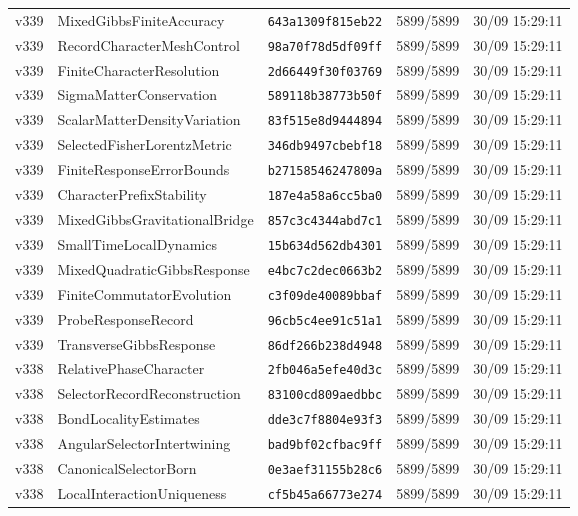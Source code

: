 \documentclass[11pt]{article}
\theoremstyle{definition}\newtheorem{deriv}{Derivation}
\begin{document}
{\begin{longtable}{@{}lllll@{}}
v339 & MixedGibbsFiniteAccuracy & \texttt{643a1309f815eb22} & 5899/5899 & 30/09 15:29:11 \\
v339 & RecordCharacterMeshControl & \texttt{98a70f78d5df09ff} & 5899/5899 & 30/09 15:29:11 \\
v339 & FiniteCharacterResolution & \texttt{2d66449f30f03769} & 5899/5899 & 30/09 15:29:11 \\
v339 & SigmaMatterConservation & \texttt{589118b38773b50f} & 5899/5899 & 30/09 15:29:11 \\
v339 & ScalarMatterDensityVariation & \texttt{83f515e8d9444894} & 5899/5899 & 30/09 15:29:11 \\
v339 & SelectedFisherLorentzMetric & \texttt{346db9497cbebf18} & 5899/5899 & 30/09 15:29:11 \\
v339 & FiniteResponseErrorBounds & \texttt{b27158546247809a} & 5899/5899 & 30/09 15:29:11 \\
v339 & CharacterPrefixStability & \texttt{187e4a58a6cc5ba0} & 5899/5899 & 30/09 15:29:11 \\
v339 & MixedGibbsGravitationalBridge & \texttt{857c3c4344abd7c1} & 5899/5899 & 30/09 15:29:11 \\
v339 & SmallTimeLocalDynamics & \texttt{15b634d562db4301} & 5899/5899 & 30/09 15:29:11 \\
v339 & MixedQuadraticGibbsResponse & \texttt{e4bc7c2dec0663b2} & 5899/5899 & 30/09 15:29:11 \\
v339 & FiniteCommutatorEvolution & \texttt{c3f09de40089bbaf} & 5899/5899 & 30/09 15:29:11 \\
v339 & ProbeResponseRecord & \texttt{96cb5c4ee91c51a1} & 5899/5899 & 30/09 15:29:11 \\
v339 & TransverseGibbsResponse & \texttt{86df266b238d4948} & 5899/5899 & 30/09 15:29:11 \\
v338 & RelativePhaseCharacter & \texttt{2fb046a5efe40d3c} & 5899/5899 & 30/09 15:29:11 \\
v338 & SelectorRecordReconstruction & \texttt{83100cd809aedbbc} & 5899/5899 & 30/09 15:29:11 \\
v338 & BondLocalityEstimates & \texttt{dde3c7f8804e93f3} & 5899/5899 & 30/09 15:29:11 \\
v338 & AngularSelectorIntertwining & \texttt{bad9bf02cfbac9ff} & 5899/5899 & 30/09 15:29:11 \\
v338 & CanonicalSelectorBorn & \texttt{0e3aef31155b28c6} & 5899/5899 & 30/09 15:29:11 \\
v338 & LocalInteractionUniqueness & \texttt{cf5b45a66773e274} & 5899/5899 & 30/09 15:29:11 \\

\end{longtable}}
\end{document}
